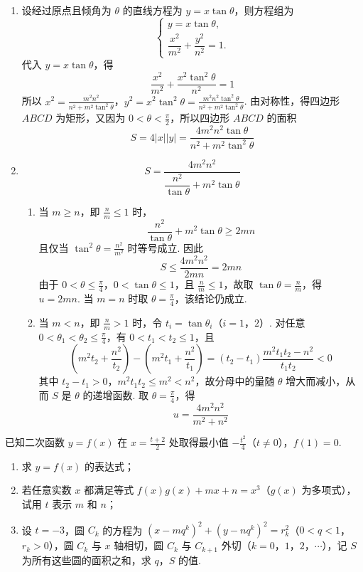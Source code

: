 \begin{solution}
\begin{enumerate}
\item 设经过原点且倾角为 \(\theta\) 的直线方程为 \(y=x\tan\theta\)，则方程组为
\[
\begin{cases}
y=x\tan\theta,\\
\dfrac{x^2}{m^2}+\dfrac{y^2}{n^2}=1.
\end{cases}
\]
代入 \(y=x\tan\theta\)，得
\[
\frac{x^2}{m^2}+\frac{x^2\tan^2\theta}{n^2}=1
\]
所以
\(x^2=\frac{m^2n^2}{n^2+m^2\tan^2\theta}\)，\(y^2=x^2\tan^2\theta =\frac{m^2n^2\tan^2\theta}{n^2+m^2\tan^2\theta}\).
由对称性，得四边形 \(ABCD\) 为矩形，又因为 \(0<\theta<\frac{\pi}{2}\)，所以四边形 \(ABCD\) 的面积
\[
S=4|x||y|=\frac{4m^2n^2\tan\theta}{n^2+m^2\tan^2\theta}
\]

\item
\[
S=\frac{4m^2n^2}{\dfrac{n^2}{\tan\theta}+m^2\tan\theta}
\]

\begin{enumerate}
\item 当 \(m\geqslant n\)，即 \(\frac{n}{m}\leqslant1\) 时，
\[
\frac{n^2}{\tan\theta}+m^2\tan\theta\geqslant2mn
\]
且仅当 \(\tan^2\theta=\frac{n^2}{m^2}\) 时等号成立. 因此
\[
S\leqslant\frac{4m^2n^2}{2mn}=2mn
\]
由于 \(0<\theta\leqslant\frac{\pi}{4}\)，\(0<\tan\theta\leqslant1\)，且 \(\frac{n}{m}\leqslant1\)，故取 \(\tan\theta=\frac{n}{m}\)，得 \(u=2mn\). 当 \(m=n\) 时取 \(\theta=\frac{\pi}{4}\)，该结论仍成立.

        \item 当 \(m<n\)，即 \(\frac{n}{m}>1\) 时，令 \(t_i=\tan\theta_i\)（\(i=1\)，\(2\)）. 对任意 \(0<\theta_1<\theta_2\leqslant\frac{\pi}{4}\)，有 \(0<t_1<t_2\leqslant1\)，且
\[
\left(m^2t_2+\frac{n^2}{t_2}\right)-\left(m^2t_1+\frac{n^2}{t_1}\right)=(t_2-t_1)\frac{m^2t_1t_2-n^2}{t_1t_2}<0
\]
其中 \(t_2-t_1>0\)，\(m^2t_1t_2\leqslant m^2<n^2\)，故分母中的量随 \(\theta\) 增大而减小，从而 \(S\) 是 \(\theta\) 的递增函数. 取 \(\theta=\frac{\pi}{4}\)，得
\[
u=\frac{4m^2n^2}{m^2+n^2}
\]
\end{enumerate}
\end{enumerate}
\end{solution}

\begin{problem}
已知二次函数 \(y=f(x)\) 在 \(x=\frac{t+2}{2}\) 处取得最小值 \(-\frac{t^2}{4}\)（\(t\neq 0\)），\(f(1)=0\).

\begin{enumerate}
\item 求 \(y=f(x)\) 的表达式；
\item 若任意实数 \(x\) 都满足等式 \(f(x)g(x)+mx+n=x^3\)（\(g(x)\) 为多项式），试用 \(t\) 表示 \(m\) 和 \(n\)；
\item 设 \(t=-3\)，圆 \(C_k\) 的方程为 \((x-mq^k)^2+(y-nq^k)^2=r_k^2\)（\(0<q<1\)，\(r_k>0\)），圆 \(C_k\) 与 \(x\) 轴相切，圆 \(C_k\) 与 \(C_{k+1}\) 外切（\(k=0\)，\(1\)，\(2\)，\(\cdots\)），记 \(S\) 为所有这些圆的面积之和，求 \(q\)，\(S\) 的值.
\end{enumerate}
\end{problem}

